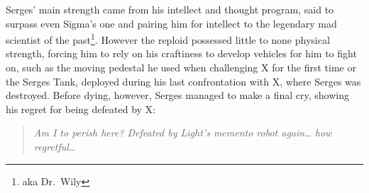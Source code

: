 Serges' main strength came from his intellect and thought program, said to surpass even Sigma's one and pairing him for intellect to the legendary mad scientist of the past\footnote{aka Dr.~Wily}. However the reploid possessed little to none physical strength, forcing him to rely on his craftiness to develop vehicles for him to fight on, such as the moving pedestal he used when challenging X for the first time or the Serges Tank, deployed during his last confrontation with X, where Serges was destroyed. Before dying, however, Serges managed to make a final cry, showing his regret for being defeated by X:
\begin{quote}
	\textit{Am I to perish here? Defeated by Light’s memento robot again… how regretful…}~\cite{wordpress:X2_japanese_script}
\end{quote}

